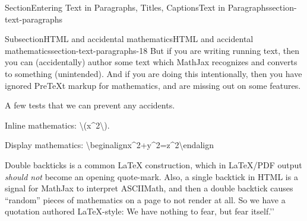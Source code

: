 \documentclass[twoside,10pt,]{article}
\DeclareRobustCommand{\initialismintitle}[1]{\texorpdfstring{#1}{#1}}
\numberwithin{equation}{section}
\begin{document}
\begin{sectionptx}{Section}{Entering Text in Paragraphs, Titles, Captions}{}{Text in Paragraphs}{}{}{section-text-paragraphs}
\begin{subsectionptx}{Subsection}{\initialismintitle{HTML} and accidental mathematics}{}{\initialismintitle{HTML} and accidental mathematics}{}{}{section-text-paragraphs-18}
But if you are writing running text, then you can (accidentally) author some text which MathJax recognizes and converts to something (unintended).  And if you are doing this intentionally, then you have ignored PreTeXt markup for mathematics, and are missing out on some features.%
\par
A few tests that we can prevent any accidents.%
\par
Inline mathematics: \textbackslash{}(x\textasciicircum{}2\textbackslash{}).%
\par
Display mathematics: \textbackslash{}begin\textbraceleft{}align\textbraceright{}x\textasciicircum{}2+y\textasciicircum{}2=z\textasciicircum{}2\textbackslash{}end\textbraceleft{}align\textbraceright{}%
\par
Double backticks is a common \LaTeX{} construction, which in \LaTeX{}\slash{}PDF output \emph{should not} become an opening quote-mark.  Also, a single backtick in HTML is a signal for MathJax to interpret ASCIIMath, and then a double backtick causes ``random'' pieces of mathematics on a page to not render at all.  So we have a quotation authored \LaTeX{}-style: \textasciigrave{}\textasciigrave{}We have nothing to fear, but fear itself.'{}'{}%
\end{subsectionptx}
\end{sectionptx}
%
%
\typeout{************************************************}
\typeout{************************************************}
%
\end{document}

